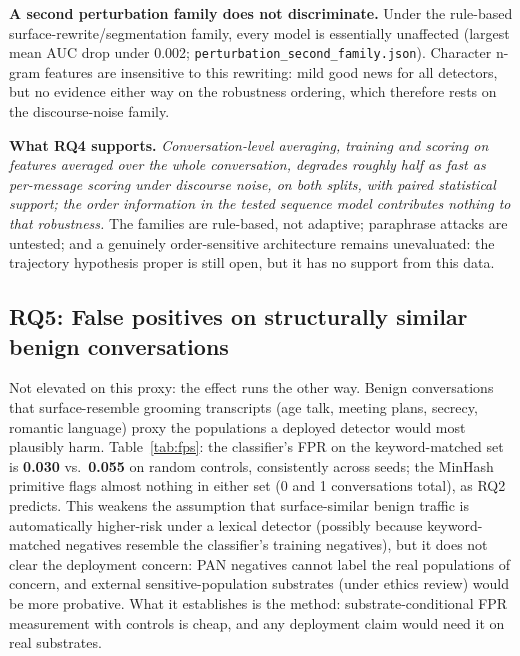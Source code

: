 \documentclass[letterpaper,twocolumn,10pt]{article}
\begin{document}
\textbf{A second perturbation family does not discriminate.} Under the
rule-based surface-rewrite/segmentation family, every model is essentially
unaffected (largest mean AUC drop under 0.002;
\texttt{perturbation\_second\_family.json}). Character n-gram features are
insensitive to this rewriting: mild good news for all detectors, but no
evidence either way on the robustness ordering, which therefore rests on the
discourse-noise family.

\textbf{What RQ4 supports.} \emph{Conversation-level averaging, training
and scoring on features averaged over the whole conversation, degrades
roughly half as fast as per-message scoring under discourse noise, on both
splits, with paired statistical support; the order information in the tested
sequence model contributes nothing to that robustness.} The families are
rule-based, not adaptive; paraphrase attacks are untested; and a genuinely
order-sensitive architecture remains unevaluated: the trajectory
hypothesis proper is still open, but it has no support from this data.

\subsection{RQ5: False positives on structurally similar benign
conversations}
\label{sec:rq5}
Not elevated on this proxy: the effect runs the other way. Benign
conversations that surface-resemble grooming transcripts (age talk, meeting
plans, secrecy, romantic language) proxy the populations a deployed detector
would most plausibly harm. Table~\ref{tab:fps}: the classifier's FPR on the
keyword-matched set is \textbf{0.030} vs.\ \textbf{0.055} on random controls,
consistently across seeds; the MinHash primitive flags almost nothing in
either set (0 and 1 conversations total), as RQ2 predicts. This weakens the
assumption that surface-similar benign traffic is automatically higher-risk
under a lexical detector (possibly because keyword-matched negatives
resemble the classifier's training negatives), but it does not clear the
deployment concern: PAN negatives cannot label the real populations of
concern, and external sensitive-population substrates (under ethics review)
would be more probative. What it establishes is the method:
substrate-conditional FPR measurement with controls is cheap, and any
deployment claim would need it on real substrates.

\begin{table}[!t]
\centering
\footnotesize
\resizebox{\columnwidth}{!}{%
}
\caption{FP substrate analysis (author-disjoint; $n{=}500$/set; 3 seeds;
pooled Wilson 95\% CIs). Source: \texttt{fp\_substrate.json}.}
\label{tab:fps}
\end{table}
\end{document}
